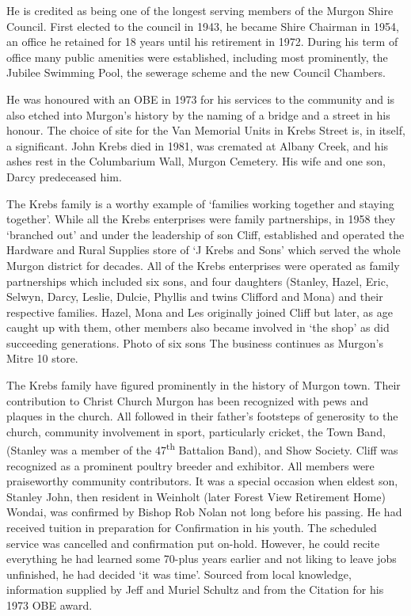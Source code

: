 He is credited as being one of the longest serving members of the Murgon Shire Council. First elected to the council in 1943, he became Shire Chairman in 1954, an office he retained for 18 years until his retirement in 1972. During his term of office many public amenities were established, including most prominently, the Jubilee Swimming Pool, the sewerage scheme and the new Council Chambers.

He was honoured with an OBE in 1973 for his services to the community and is also etched into Murgon's history by the naming of a bridge and a street in his honour. The choice of site for the Van Memorial Units in Krebs Street is, in itself, a significant. John Krebs died in 1981, was cremated at Albany Creek, and his ashes rest in the Columbarium Wall, Murgon Cemetery. His wife and one son, Darcy predeceased him.

The Krebs family is a worthy example of `families working together and staying together'. While all the Krebs enterprises were family partnerships, in 1958 they `branched out' and under the leadership of son Cliff, established and operated the Hardware and Rural Supplies store of `J Krebs and Sons' which served the whole Murgon district for decades. All of the Krebs enterprises were operated as family partnerships which included six sons, and four daughters (Stanley, Hazel, Eric, Selwyn, Darcy, Leslie, Dulcie, Phyllis and twins Clifford and Mona) and their respective families. Hazel, Mona and Les originally joined Cliff but later, as age caught up with them, other members also became involved in `the shop' as did succeeding generations. Photo of six sons The business continues as Murgon's Mitre 10 store.

The Krebs family have figured prominently in the history of Murgon town. Their contribution to Christ Church Murgon has been recognized with pews and plaques in the church. All followed in their father's footsteps of generosity to the church, community involvement in sport, particularly cricket, the Town Band, (Stanley was a member of the 47\textsuperscript{th} Battalion Band), and Show Society. Cliff was recognized as a prominent poultry breeder and exhibitor. All members were praiseworthy community contributors. It was a special occasion when eldest son, Stanley John, then resident in Weinholt (later Forest View Retirement Home) Wondai, was confirmed by Bishop Rob Nolan not long before his passing. He had received tuition in preparation for Confirmation in his youth. The scheduled service was cancelled and confirmation put on-hold. However, he could recite everything he had learned some 70-plus years earlier and not liking to leave jobs unfinished, he had decided `it was time'. Sourced from local knowledge, information supplied by Jeff and Muriel Schultz and from the Citation for his 1973 OBE award.

